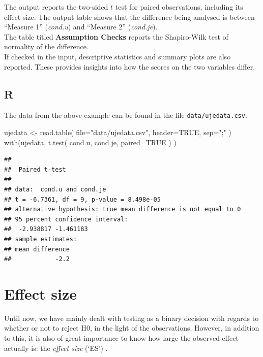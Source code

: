 \documentclass[
]{book}
\newenvironment{Shaded}{\begin{snugshade}}{\end{snugshade}}
\newcommand{\AttributeTok}[1]{\textcolor[rgb]{0.77,0.63,0.00}{#1}}
\newcommand{\ConstantTok}[1]{\textcolor[rgb]{0.00,0.00,0.00}{#1}}
\newcommand{\FunctionTok}[1]{\textcolor[rgb]{0.00,0.00,0.00}{#1}}
\newcommand{\NormalTok}[1]{#1}
\newcommand{\OtherTok}[1]{\textcolor[rgb]{0.56,0.35,0.01}{#1}}
\newcommand{\StringTok}[1]{\textcolor[rgb]{0.31,0.60,0.02}{#1}}
\begin{document}
The output reports the two-sided \(t\) test for paired observations, including its effect size. The output table shows that the difference being analysed is between ``Measure 1'' (\emph{cond.u}) and ``Measure 2'' (\emph{cond.je}).\\
The table titled \textbf{Assumption Checks} reports the Shapiro-Wilk test of normality of the difference.\\
If checked in the input, descriptive statistics and summary plots are also reported. These provides insights into how the scores on the two variables differ.

\hypertarget{sec:R-ttest-paired}{%
\subsection{R}\label{sec:R-ttest-paired}}

The data from the above example can be found in the file \texttt{data/ujedata.csv}.

\begin{Shaded}
\begin{Highlighting}[]
\NormalTok{ujedata }\OtherTok{\textless{}{-}} \FunctionTok{read.table}\NormalTok{( }\AttributeTok{file=}\StringTok{"data/ujedata.csv"}\NormalTok{, }\AttributeTok{header=}\ConstantTok{TRUE}\NormalTok{, }\AttributeTok{sep=}\StringTok{";"}\NormalTok{ )}
\FunctionTok{with}\NormalTok{(ujedata, }\FunctionTok{t.test}\NormalTok{( cond.u, cond.je, }\AttributeTok{paired=}\ConstantTok{TRUE}\NormalTok{ ) )}
\end{Highlighting}
\end{Shaded}

\begin{verbatim}
## 
##  Paired t-test
## 
## data:  cond.u and cond.je
## t = -6.7361, df = 9, p-value = 8.498e-05
## alternative hypothesis: true mean difference is not equal to 0
## 95 percent confidence interval:
##  -2.938817 -1.461183
## sample estimates:
## mean difference 
##            -2.2
\end{verbatim}

\hypertarget{sec:ttest-effectsize}{%
\section{Effect size}\label{sec:ttest-effectsize}}

Until now, we have mainly dealt with testing as a binary
decision with regards to whether or not to reject H0, in the light
of the observations. However, in addition to this, it is also of great importance to know how large the observed effect actually is: the \emph{effect size} (`ES') \citep{Cohen88, Thom02, Naka07}.
\end{document}
